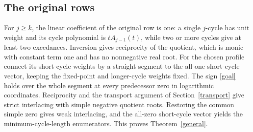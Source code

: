 \subsection{The original rows}
For \(j\ge k\), the linear coefficient of the original row is one:
a single \(j\)-cycle has unit weight and its cycle polynomial is
\(tA_{j-1}(t)\), while two or more cycles give at least two excedances.
Inversion gives reciprocity of the quotient, which is monic with
constant term one and has no nonnegative real root.
For the chosen profile connect its short-cycle weights by a straight
segment to the all-one short-cycle vector, keeping the fixed-point
and longer-cycle weights fixed. The sign \eqref{goal} holds over the
whole segment at every predecessor zero in logarithmic coordinates.
Reciprocity and the transport argument of Section~\ref{transport}
give strict interlacing with simple negative quotient roots.
Restoring the common simple zero gives weak interlacing, and the
all-zero short-cycle vector yields the minimum-cycle-length
enumerators. This proves Theorem~\ref{general}.
